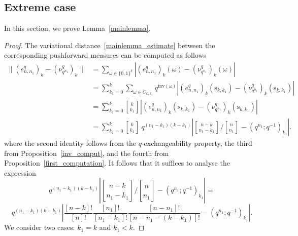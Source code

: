 \documentclass[12pt, a4paper]{amsart}
\numberwithin{equation}{subsection}
\theoremstyle{definition}
\newcommand{\qbinom}[3]{\genfrac{[}{]}{0pt}{}{#1}{#2}_{#3}}
\begin{document}
\subsection{Extreme case}\label{sec:extreme} 
In this section, we prove Lemma~\eqref{mainlemma}. 
\begin{proof}
The variational distance~\eqref{mainlemma_estimate}  between the corresponding pushforward measures can be computed as follows
\begin{align*}
\big\| (e^{q}_{n, n_1})_k - (\nu^{q}_{q^{n_{1}}})_k \big\| 
&= \sum_{\omega \in \{0,1\}^{k}} \left| (e^{q}_{n, n_1})_k (\omega) - (\nu^{q}_{q^{n_{1}}})_k (\omega)\right| \\
&=  \sum_{k_1 = 0}^{k}\sum_{\omega \in C_{k,k_{1}}} q^{\text{inv}(\omega)}\left| (e^{q}_{n, n_1})_k (\text{s}_{k,k_{1}}) - (\nu^{q}_{q^{n_{1}}})_k (\text{s}_{k,k_{1}})\right| \\&= \sum_{k_1 = 0}^{k} \qbinom{k}{k_1}{}
\left| (e^{q}_{n, n_1})_k (\text{s}_{k,k_{1}}) - (\nu^{q}_{q^{n_{1}}})_k (\text{s}_{k,k_{1}})\right| \\&= \sum_{k_1 = 0}^{k} \qbinom{k}{k_1}{} \, q^{(n_1 - k_1)(k - k_1)}
\left| \qbinom{n-k}{n_{1}-k_{1}}{} \bigg/ \qbinom{n}{n_{1}}{}  
- (q^{n_1}; q^{-1})_{k_1} \right|.
\end{align*}
where the second identity follows from the $q$-exchangeability property, the third from Proposition~\eqref{inv_comput}, and the fourth from Proposition~\eqref{first_computation}. It follows that it suffices to analyse the expression 
\begin{equation}\label{expression2}
 q^{(n_{1} - k_{1})(k-k_{1})}\left|\qbinom{n-k}{n_{1}-k_{1}}{} \bigg/ \qbinom{n}{n_{1}}{} - (q^{n_{1}}; q^{-1})_{k_{1}}\right| =
\end{equation}
\begin{equation*}
 q^{(n_{1} - k_{1})(k-k_{1})} \left|\dfrac{[n-k]!}{[n]!} \dfrac{[n_{1}]!}{[n_{1}-k_{1}]!}\dfrac{[n-n_{1}]! }{[n-n_{1}-(k-k_{1})]!} - (q^{n_{1}}; q^{-1})_{k_{1}}\right|.
\end{equation*}
We consider two cases: $k_1 = k$ and $k_1 < k$.


\end{proof}
\end{document}
